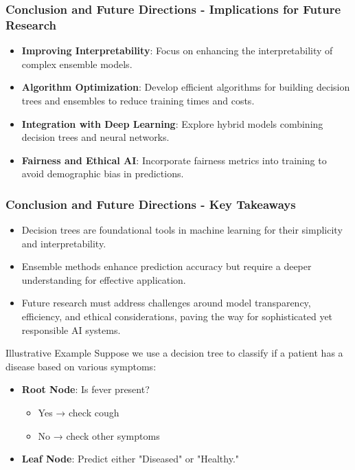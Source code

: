 \documentclass{beamer}
\begin{document}
\begin{frame}[fragile]
    \frametitle{Conclusion and Future Directions - Implications for Future Research}
    
    \begin{itemize}
        \item \textbf{Improving Interpretability}:  
          Focus on enhancing the interpretability of complex ensemble models.
        
        \item \textbf{Algorithm Optimization}:  
          Develop efficient algorithms for building decision trees and ensembles to reduce training times and costs.
        
        \item \textbf{Integration with Deep Learning}:  
          Explore hybrid models combining decision trees and neural networks.
        
        \item \textbf{Fairness and Ethical AI}:  
          Incorporate fairness metrics into training to avoid demographic bias in predictions.
    \end{itemize}
\end{frame}

\begin{frame}[fragile]
    \frametitle{Conclusion and Future Directions - Key Takeaways}
    
    \begin{itemize}
        \item Decision trees are foundational tools in machine learning for their simplicity and interpretability.
        \item Ensemble methods enhance prediction accuracy but require a deeper understanding for effective application.
        \item Future research must address challenges around model transparency, efficiency, and ethical considerations, paving the way for sophisticated yet responsible AI systems.
    \end{itemize}
    
    \begin{block}{Illustrative Example}
        Suppose we use a decision tree to classify if a patient has a disease based on various symptoms:
        
        \begin{itemize}
            \item \textbf{Root Node}: Is fever present? 
                \begin{itemize}
                    \item Yes → check cough 
                    \item No → check other symptoms 
                \end{itemize}
            \item \textbf{Leaf Node}: Predict either "Diseased" or "Healthy."
        \end{itemize}
    \end{block}
\end{frame}
\end{document}

